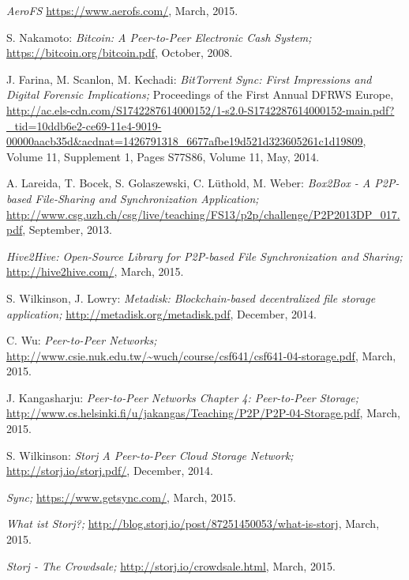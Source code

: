 \begin{thebibliography}{99}
		\emph{AeroFS}
		\url{https://www.aerofs.com/},
		March, 2015.

		S. Nakamoto:
		\emph{Bitcoin: A Peer-to-Peer Electronic Cash System;}
		\url{https://bitcoin.org/bitcoin.pdf},
		October, 2008.

		J. Farina, M. Scanlon, M. Kechadi:
		\emph{BitTorrent Sync: First Impressions and Digital Forensic Implications;}
		Proceedings of the First Annual DFRWS Europe,
		\url{http://ac.els-cdn.com/S1742287614000152/1-s2.0-S1742287614000152-main.pdf?_tid=10ddb6e2-ce69-11e4-9019-00000aacb35d&acdnat=1426791318_6677afbe19d521d323605261c1d19809},
		Volume 11, Supplement 1, Pages S77\textendash S86, Volume 11, May, 2014.

		A. Lareida, T. Bocek, S. Golaszewski, C. L\"uthold, M. Weber:
		\emph{Box2Box - A P2P-based File-Sharing and Synchronization Application;}
		\url{http://www.csg.uzh.ch/csg/live/teaching/FS13/p2p/challenge/P2P2013DP_017.pdf},
		September, 2013.

		\emph{Hive2Hive: Open-Source Library for P2P-based File Synchronization and Sharing;}
		\url{http://hive2hive.com/},
		March, 2015.

		S. Wilkinson, J. Lowry:
		\emph{Metadisk: Blockchain-based decentralized file storage application;}
		\url{http://metadisk.org/metadisk.pdf},
		December, 2014.

		C. Wu:
		\emph{Peer-to-Peer Networks;}
		\url{http://www.csie.nuk.edu.tw/~wuch/course/csf641/csf641-04-storage.pdf},
		March, 2015.

		J. Kangasharju:
		\emph{Peer-to-Peer Networks Chapter 4: Peer-to-Peer Storage;}
		\url{http://www.cs.helsinki.fi/u/jakangas/Teaching/P2P/P2P-04-Storage.pdf},
		March, 2015.

		S. Wilkinson:
		\emph{Storj A Peer-to-Peer Cloud Storage Network;}
		\url{http://storj.io/storj.pdf/},
		December, 2014.

		\emph{Sync;}
		\url{https://www.getsync.com/},
		March, 2015.
		
		\emph{What ist Storj?;}
		\url{http://blog.storj.io/post/87251450053/what-is-storj},
		March, 2015.
		
		\emph{Storj - The Crowdsale;}
		\url{http://storj.io/crowdsale.html},
		March, 2015.
		

\end{thebibliography}
